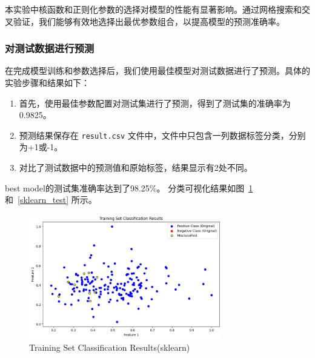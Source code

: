 \documentclass[12pt]{article}
\begin{document}
本实验中核函数和正则化参数的选择对模型的性能有显著影响。通过网格搜索和交叉验证，我们能够有效地选择出最优参数组合，以提高模型的预测准确率。
\subsubsection{对测试数据进行预测}

在完成模型训练和参数选择后，我们使用最佳模型对测试数据进行了预测。具体的实验步骤和结果如下：

\begin{enumerate}
  \item 首先，使用最佳参数配置对测试集进行了预测，得到了测试集的准确率为0.9825。
  \item 预测结果保存在 \texttt{result.csv} 文件中，文件中只包含一列数据标签分类，分别为+1或-1。
  \item 对比了测试数据中的预测值和原始标签，结果显示有2处不同。
\end{enumerate}




best model的测试集准确率达到了98.25\%。
分类可视化结果如图~\ref{sklearn_train} 和~\ref{sklearn_test} 所示。

\begin{figure}[htbp]
  \centering
  \includegraphics[width=0.75\textwidth]{figures/sklearn_train.png}
  \caption{Training Set Classification Results(sklearn)}
  \label{sklearn_train}
\end{figure}
\end{document}
